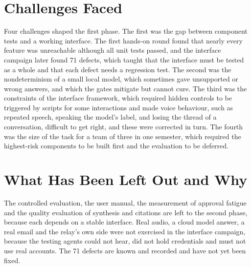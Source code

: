 \documentclass{FastFyp}
\begin{document}
\section{Challenges Faced}
Four challenges shaped the first phase. The first was the gap between component tests and a working interface. The first hands-on round found that nearly every feature was unreachable although all unit tests passed, and the interface campaign later found 71 defects, which taught that the interface must be tested as a whole and that each defect needs a regression test. The second was the nondeterminism of a small local model, which sometimes gave unsupported or wrong answers, and which the gates mitigate but cannot cure. The third was the constraints of the interface framework, which required hidden controls to be triggered by scripts for some interactions and made voice behaviour, such as repeated speech, speaking the model's label, and losing the thread of a conversation, difficult to get right, and these were corrected in turn. The fourth was the size of the task for a team of three in one semester, which required the highest-risk components to be built first and the evaluation to be deferred.

\section{What Has Been Left Out and Why}
The controlled evaluation, the user manual, the measurement of approval fatigue and the quality evaluation of synthesis and citations are left to the second phase, because each depends on a stable interface. Real audio, a cloud model answer, a real email and the relay's own side were not exercised in the interface campaign, because the testing agents could not hear, did not hold credentials and must not use real accounts. The 71 defects are known and recorded and have not yet been fixed.
\end{document}
